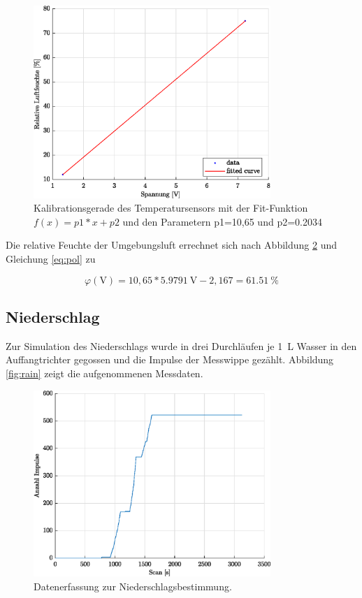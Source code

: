 \begin{figure}[H]
	\centering
	\includegraphics[width=0.8\textwidth]{../DATA/Kalibriergerade_Feuchte.eps}
	\caption[Kalibrationsgerade des Temperatursensors]{Kalibrationsgerade des Temperatursensors mit der Fit-Funktion $f(x) = p1*x + p2$ und den Parametern p1=10,65 und p2=0.2034}
	\label{fig:cal2}
\end{figure}

Die relative Feuchte der Umgebungsluft errechnet sich nach Abbildung \ref{fig:cal2} und Gleichung \ref{eq:pol} zu

\begin{equation}
	\label{eq:cal}
	\varphi(\text{V})=10,65*\SI{5,9791}{\volt}-2,167=\SI{61,51}{\percent}
\end{equation}
		
\subsection{Niederschlag}
Zur Simulation des Niederschlags wurde in drei Durchläufen je \SI{1}{\liter} Wasser in den Auffangtrichter gegossen und die Impulse der Messwippe gezählt. Abbildung \ref{fig:rain} zeigt die aufgenommenen Messdaten. 

\begin{figure}[H]
	\centering
	\includegraphics[width=0.8\textwidth]{../DATA/Messreihe_Niederschlag.eps}
	\caption[Datenerfassung zur Niederschlagsbestimmung]{Datenerfassung zur Niederschlagsbestimmung.}
	\label{fig:cal2}
\end{figure}

